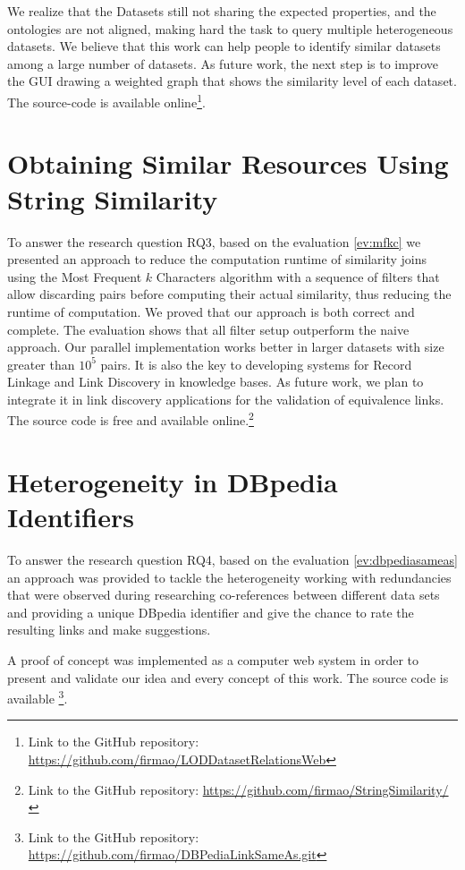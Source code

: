 We realize that the Datasets still not sharing the expected properties, and the ontologies are not aligned, making hard the task to query multiple heterogeneous datasets.
We believe that this work can help people to identify similar datasets among a large number of datasets.
As future work, the next step is to improve the GUI drawing a weighted graph that shows the similarity level of each dataset.
The source-code is available online\footnote{Link to the GitHub repository:  \url{https://github.com/firmao/LODDatasetRelationsWeb}}.

\section{Obtaining Similar Resources Using String Similarity}
To answer the research question RQ3, based on the evaluation \ref{ev:mfkc} we presented an approach to reduce the computation runtime of similarity joins using the Most Frequent $k$ Characters algorithm with a sequence of filters that allow discarding pairs before computing their actual similarity, thus reducing the runtime of computation.
We proved that our approach is both correct and complete. 
The evaluation shows that all filter setup outperform the naive approach. Our parallel implementation works better in larger datasets with size greater than $10^5$ pairs.
It is also the key to developing systems for Record Linkage and Link Discovery in knowledge bases.
As future work, we plan to integrate it in link discovery applications for the validation of equivalence links. The source code is free and available online.\footnote{Link to the GitHub repository: \url{https://github.com/firmao/StringSimilarity/}}

\section{Heterogeneity in DBpedia Identifiers}
To answer the research question RQ4, based on the evaluation \ref{ev:dbpediasameas} an approach was provided to tackle the heterogeneity working with  redundancies that were observed during researching co-references between different data sets and providing a unique DBpedia identifier and give the chance to rate the resulting links and make suggestions.

A proof of concept was implemented as a computer web system in order to present and validate our idea and every concept of this work. The source code is available \footnote{Link to the GitHub repository: \url{https://github.com/firmao/DBPediaLinkSameAs.git}}.

